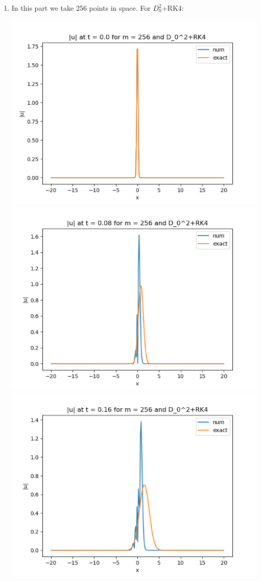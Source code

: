 \documentclass{article}
\begin{document}
\begin{enumerate}[label=(\alph*)]
\item 
In this part we take 256 points in space. For $D_0^2$+RK4:
\begin{center}
	\includegraphics[scale=.3]{FINAL u_abs t = 0.0 m = 256 D02+RK4}
	\includegraphics[scale=.3]{FINAL u_abs t = 0.08 m = 256 D02+RK4}
	\includegraphics[scale=.3]{FINAL u_abs t = 0.16 m = 256 D02+RK4}

\end{center}
\end{enumerate}
\end{document}
